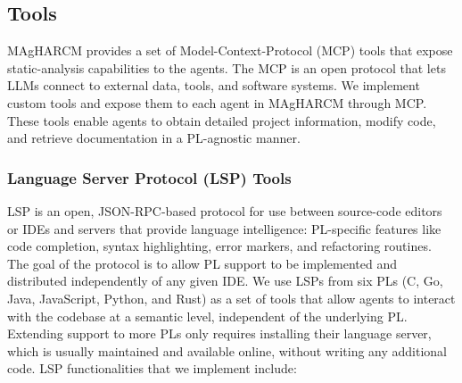 \subsection{Tools}
\label{sec:method_tools}

MAgHARCM provides a set of Model-Context-Protocol (MCP) tools that
expose static-analysis capabilities to the agents. The MCP is an open protocol that lets
LLMs connect to external data, tools, and software systems. We
implement custom tools and expose them to each agent in MAgHARCM
through MCP. These tools enable agents to obtain detailed project
information, modify code, and retrieve documentation in a PL-agnostic
manner.

\subsubsection{Language Server Protocol (LSP) Tools}
\label{sec:method_tools_lsp}

LSP is an open, JSON-RPC-based protocol for use between source-code
editors or IDEs and servers that provide language intelligence:
PL-specific features like code completion, syntax highlighting, error
markers, and refactoring routines. The goal of the protocol is to allow
PL support to be implemented and distributed independently of any
given IDE. We use LSPs from six PLs (C, Go, Java, JavaScript, Python,
and Rust) as a set of tools that allow agents to interact with the
codebase at a semantic level, independent of the underlying PL.
Extending support to more PLs only requires installing their language
server, which is usually maintained and available online, without
writing any additional code. LSP functionalities that we implement
include:

